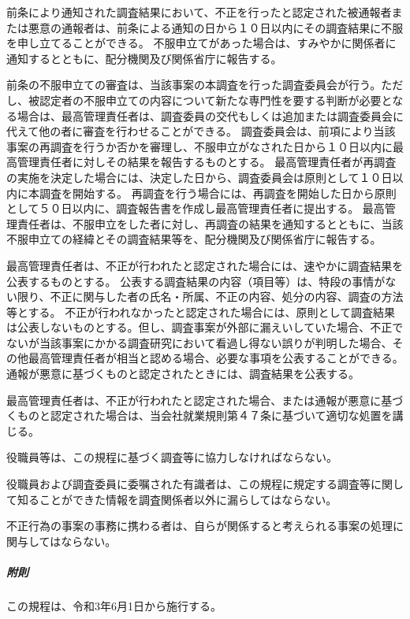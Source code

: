 \documentclass[10pt,a4paper,uplatex]{jsarticle}
\begin{document}
前条により通知された調査結果において、不正を行ったと認定された被通報者または悪意の通報者は、前条による通知の日から１０日以内にその調査結果に不服を申し立てることができる。
\term 不服申立てがあった場合は、すみやかに関係者に通知するとともに、配分機関及び関係省庁に報告する。

前条の不服申立ての審査は、当該事案の本調査を行った調査委員会が行う。ただし、被認定者の不服申立ての内容について新たな専門性を要する判断が必要となる場合は、最高管理責任者は、調査委員の交代もしくは追加または調査委員会に代えて他の者に審査を行わせることができる。
\term 調査委員会は、前項により当該事案の再調査を行うか否かを審理し、不服申立がなされた日から１０日以内に最高管理責任者に対しその結果を報告するものとする。
\term 最高管理責任者が再調査の実施を決定した場合には、決定した日から、調査委員会は原則として１０日以内に本調査を開始する。
\term 再調査を行う場合には、再調査を開始した日から原則として５０日以内に、調査報告書を作成し最高管理責任者に提出する。
\term 最高管理責任者は、不服申立をした者に対し、再調査の結果を通知するとともに、当該不服申立ての経緯とその調査結果等を、配分機関及び関係省庁に報告する。

最高管理責任者は、不正が行われたと認定された場合には、速やかに調査結果を公表するものとする。
\term 公表する調査結果の内容（項目等）は、特段の事情がない限り、不正に関与した者の氏名・所属、不正の内容、処分の内容、調査の方法等とする。
\term 不正が行われなかったと認定された場合には、原則として調査結果は公表しないものとする。但し、調査事案が外部に漏えいしていた場合、不正でないが当該事案にかかる調査研究において看過し得ない誤りが判明した場合、その他最高管理責任者が相当と認める場合、必要な事項を公表することができる。
\term 通報が悪意に基づくものと認定されたときには、調査結果を公表する。

最高管理責任者は、不正が行われたと認定された場合、または通報が悪意に基づくものと認定された場合は、当会社就業規則第４７条に基づいて適切な処置を講じる。

役職員等は、この規程に基づく調査等に協力しなければならない。

役職員および調査委員に委嘱された有識者は、この規程に規定する調査等に関して知ることができた情報を調査関係者以外に漏らしてはならない。

不正行為の事案の事務に携わる者は、自らが関係すると考えられる事案の処理に関与してはならない。
\\

\subparagraph{附則}
この規程は、令和3年6月1日から施行する。
\end{document}
